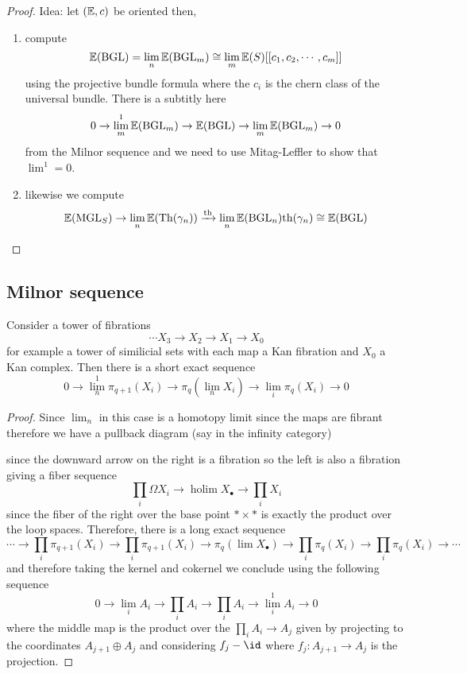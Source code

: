 \documentclass{article}
\newcommand{\MGL}{\mathrm{MGL}}
\newcommand{\BGL}{\mathrm{BGL}}
\newcommand{\Th}{\mathrm{Th}}
\DeclareMathOperator{\holim}{\mathrm{holim}}
\begin{document}
\begin{proof}
Idea: let $(\mathbb{E}, c)$ be oriented then,
\begin{enumerate}
\item compute 
\[ \EE(\BGL) = \lim_n \EE(\BGL_m) \cong \lim_m \EE(S) [[c_1, c_2, \cdots, c_m]] \]
using the projective bundle formula where the $c_i$ is the chern class of the universal bundle. There is a subtitly here
\[ 0 \to \lim^1_m \EE(\BGL_m) \to \EE(\BGL) \to \lim_m \EE(\BGL_m) \to 0 \]
from the Milnor sequence
and we need to use Mitag-Leffler to show that $\lim^1 = 0$. 
\item likewise we compute 
\[ \EE(\MGL_S)  \to \lim_n \EE(\Th(\gamma_n)) \xrightarrow{\th} \lim_n \EE(\BGL_n) \th(\gamma_n) \cong \EE(\BGL) \]
\end{enumerate}
\end{proof}

\subsection{Milnor sequence}

Consider a tower of fibrations
\[ \cdots X_3 \to X_2 \to X_1 \to X_0 \]
for example a tower of similicial sets with each map a Kan fibration and $X_0$ a Kan complex. Then there is a short exact sequence
\[ 0 \to \lim^1_n \pi_{q+1}(X_i) \to \pi_q(\lim_n X_i) \to \lim_i \pi_q(X_i) \to 0 \]

\begin{proof}
Since $\lim_n$ in this case is a homotopy limit since the maps are fibrant therefore we have a pullback diagram (say in the infinity category)
\begin{center}
\end{center}
since the downward arrow on the right is a fibration so the left is also a fibration giving a fiber sequence
\[ \prod_i \Omega X_i \to \holim X_\bullet \to \prod_i X_i \]
since the fiber of the right over the base point $* \times *$ is exactly the product over the loop spaces. Therefore, there is a long exact sequence
\[ \cdots \to \prod_i \pi_{q+1}(X_i) \to \prod_i \pi_{q+1}(X_i) \to \pi_q(\lim X_\bullet) \to \prod_i \pi_q(X_i) \to \prod_i \pi_q(X_i) \to \cdots \]
and therefore taking the kernel and cokernel we conclude using the following sequence
\[ 0 \to \lim_i A_i \to \prod_i A_i \to \prod_i A_i \to \lim_i^1 A_i \to 0 \]
where the middle map is the product over the $\prod_i A_i \to A_j$ given by projecting to the coordinates $A_{j+1} \oplus A_j$ and considering $f_{j} - \id$ where $f_j : A_{j+1} \to A_j$ is the projection.
\end{proof}
\end{document}
